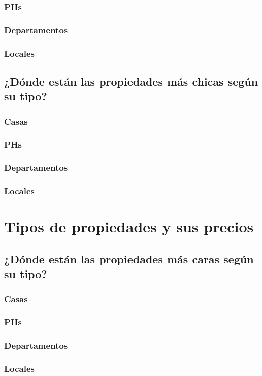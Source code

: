 \documentclass[a4paper, 10pt]{article}
\begin{document}
				\subsubsection{PHs}
				\subsubsection{Departamentos}
				\subsubsection{Locales}
			\subsection{¿Dónde están las propiedades más chicas según su tipo?}
				\subsubsection{Casas}
				\subsubsection{PHs}
				\subsubsection{Departamentos}
				\subsubsection{Locales}
		\section{Tipos de propiedades y sus precios}
			\subsection{¿Dónde están las propiedades más caras según su tipo?}
				\subsubsection{Casas}
				\subsubsection{PHs}
				\subsubsection{Departamentos}
				\subsubsection{Locales}
\end{document}
